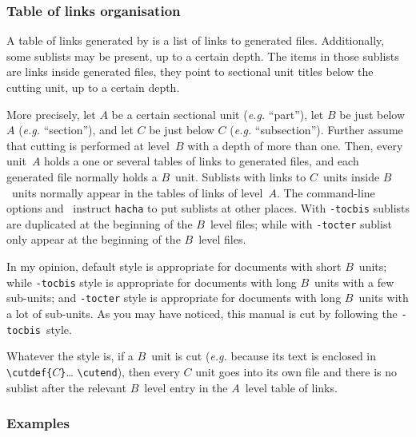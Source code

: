 \subsubsection{Table\label{table:link:style} of links organisation}
A table of links generated by \hacha{} is a list
of links to generated files.
Additionally, some sublists may be present, up to a certain depth.
The items in those sublists are
links inside generated files, they point to sectional unit titles
below the cutting unit, up to a certain depth.

More precisely, let $A$ be a certain sectional unit (\emph{e.g.}
``part''), let $B$ be just below $A$
(\emph{e.g.} ``section''),
and let $C$ be just below $C$ (\emph{e.g.} ``subsection'').
Further assume that cutting is performed at level~$B$ with a depth of
more than one.
Then, every unit~$A$ holds a one or several tables of links
to generated files, and each generated file normally holds a $B$~unit.
Sublists with links to $C$~units inside $B$~units normally appear in the
tables of links of level~$A$.
The command-line options 
and~ instruct \texttt{hacha}
to put sublists at other places.
With \texttt{-tocbis} sublists are duplicated at the beginning
of the $B$~level files; while with \texttt{-tocter} sublist only
appear at the beginning
of the $B$~level files.

In my opinion,
default style is appropriate for documents with short $B$~units;
while \texttt{-tocbis} style
is appropriate for documents with long $B$~units with
a few sub-units; and \texttt{-tocter} style is appropriate
for documents with long $B$~units with
a lot of sub-units.
\ifhevea
As you may have noticed, this manual is cut by following the
\texttt{-tocbis}~style.\fi

Whatever the style is, if a $B$~unit is cut
(\emph{e.g.} because its text is enclosed in
\verb+\cutdef{+$C$\verb+}+\ldots{} \verb+\cutend+),
then every $C$ unit goes into its own file and there is no sublist
after the relevant $B$~level entry in the $A$~level table of links.

\subsubsection{Examples}

